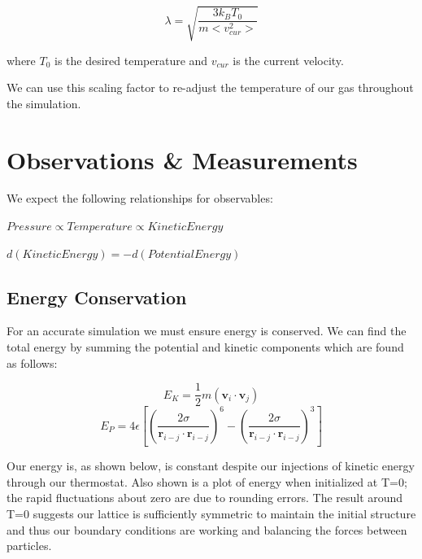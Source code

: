 \documentclass[10pt]{article}
\newcommand{\beq}{\begin{equation}}
\newcommand{\eeq}{\end{equation}}
\begin{document}
\beq
\label{eqn:equation7}
\lambda = \sqrt{\frac{3k_BT_{0}}{m<v_{cur}^2>}}
\eeq
\newline

where $T_{0}$ is the desired temperature and $v_{cur}$ is the current velocity.

We can use this scaling factor to re-adjust the temperature of our gas throughout the simulation.  

\section{Observations \& Measurements}
We expect the following relationships for observables:

	\begin{center}
	$Pressure \propto Temperature \propto Kinetic Energy$
	\end{center}
	
	\begin{center}
	$d(Kinetic Energy) = -d(Potential Energy)$
	\end{center}
	

\subsection{Energy Conservation}
For an accurate simulation we must ensure energy is conserved.  We can find the total energy by summing the potential and kinetic components which are found as follows:

\beq
\label{eqn:equation8}
E_K = \frac{1}{2}m(\textbf{v}_{i}\cdot\textbf{v}_j)
\eeq
\beq
\label{eqn:equation9}
E_P = 4\epsilon[(\frac{2\sigma}{\textbf{r}_{i-j}\cdot\textbf{r}_{i-j}})^6-(\frac{2\sigma}{\textbf{r}_{i-j}\cdot\textbf{r}_{i-j}})^3]
\eeq

Our energy is, as shown below, is constant despite our injections of kinetic energy through our thermostat.  Also shown is a plot of energy when initialized at T=0; the rapid fluctuations about zero are due to rounding errors.  The result around T=0 suggests our lattice is sufficiently symmetric to maintain the initial structure and thus our boundary conditions are working and balancing the forces between particles.
\end{document}
